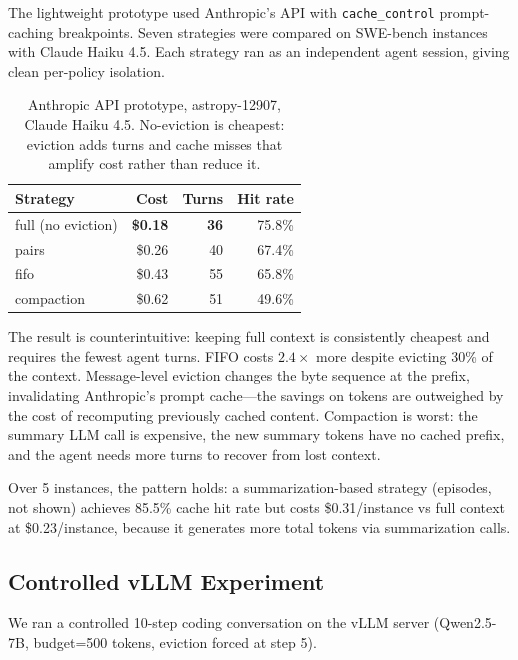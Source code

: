 \documentclass[letterpaper,twocolumn,10pt]{article}
\begin{document}
The lightweight prototype used Anthropic's API with \texttt{cache\_control}
prompt-caching breakpoints. Seven strategies were compared on SWE-bench
instances with Claude Haiku 4.5. Each strategy ran as an independent agent
session, giving clean per-policy isolation.

\begin{table}[h]
\centering\small
\begin{tabular}{lrrr}
\toprule
\textbf{Strategy} & \textbf{Cost} & \textbf{Turns} & \textbf{Hit rate} \\
\midrule
full (no eviction) & \textbf{\$0.18} & \textbf{36} & 75.8\% \\
pairs              & \$0.26          & 40           & 67.4\% \\
fifo               & \$0.43          & 55           & 65.8\% \\
compaction         & \$0.62          & 51           & 49.6\% \\
\bottomrule
\end{tabular}
\caption{Anthropic API prototype, astropy-12907, Claude Haiku 4.5.
No-eviction is cheapest: eviction adds turns and cache misses that
amplify cost rather than reduce it.}
\label{tab:prototype}
\end{table}

The result is counterintuitive: keeping full context is consistently cheapest
and requires the fewest agent turns. FIFO costs $2.4\times$ more despite
evicting 30\% of the context. Message-level eviction changes the byte sequence
at the prefix, invalidating Anthropic's prompt cache---the savings on tokens
are outweighed by the cost of recomputing previously cached content. Compaction
is worst: the summary LLM call is expensive, the new summary tokens have no
cached prefix, and the agent needs more turns to recover from lost context.

Over 5 instances, the pattern holds: a summarization-based strategy
(episodes, not shown) achieves 85.5\% cache hit rate but costs
\$0.31/instance vs full context at \$0.23/instance, because it generates
more total tokens via summarization calls.

\subsection{Controlled vLLM Experiment}
\label{sec:vllm_exp}

We ran a controlled 10-step coding conversation on the vLLM server
(Qwen2.5-7B, budget=500 tokens, eviction forced at step 5).
\end{document}
